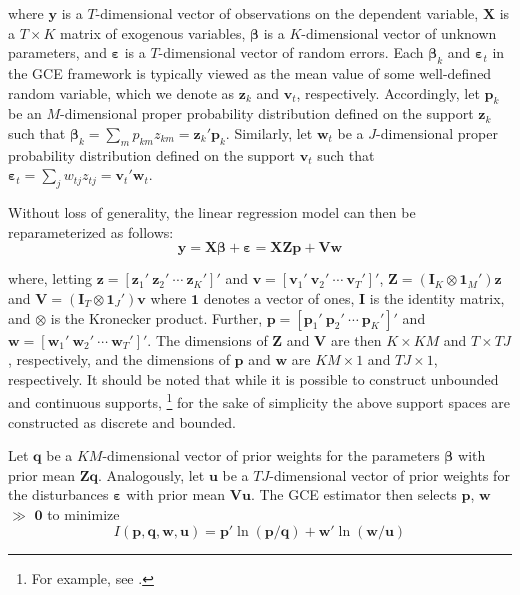 \documentclass[english]{article}
\begin{document}
\noindent
where $\mathbf{y}$ is a $T$-dimensional vector of observations on the 
dependent variable, $\mathbf{X}$ is a $T\times K$ matrix of exogenous
variables, $\mathbf{\beta}$ is a $K$-dimensional vector of unknown 
parameters, and $\mathbf{\varepsilon}$ is a $T$-dimensional vector of 
random errors.
Each $\mathbf{\beta}_k$ and $\mathbf{\varepsilon}_t$ in the GCE 
framework is typically viewed as the mean value of some well-defined 
random variable, which we denote as $\mathbf{z}_k$ and $\mathbf{v}_t$, 
respectively.
Accordingly, let $\mathbf{p}_k$ be an $M$-dimensional proper 
probability distribution defined on the support $\mathbf{z}_k$ such that 
$\mathbf{\beta}_k = \sum_m p_{km}z_{km} = \mathbf{z}_k' 
\mathbf{p}_k$.
Similarly, let $\mathbf{w}_t$ be a $J$-dimensional proper probability 
distribution defined on the support $\mathbf{v}_t$ such that  
$\mathbf{\varepsilon}_t = \sum_j w_{tj}z_{tj} = \mathbf{v}_t' 
\mathbf{w}_t$.

Without loss of generality, the linear regression model can then be 
reparameterized as follows:
\begin{equation}
\mathbf{y} = \mathbf{X\beta} + \mathbf{\varepsilon} = 
\mathbf{X Z p} + \mathbf{V w}
\label{eq: reparm}
\end{equation}

\noindent
where, letting $\mathbf{z}=[\mathbf{z}_1' ~ \mathbf{z}_2' ~ \cdots ~ 
\mathbf{z}_K' ]'$ and $\mathbf{v}=[\mathbf{v}_1' ~ \mathbf{v}_2' ~ 
\cdots ~ \mathbf{v}_T' ]'$, 
$\mathbf{Z}= (\mathbf{I}_K \otimes \mathbf{1}_M')\mathbf{z}$ and
$\mathbf{V}= (\mathbf{I}_T \otimes \mathbf{1}_J')\mathbf{v}$
where $\mathbf{1}$ denotes a vector of ones, $\mathbf{I}$ is the 
identity matrix, and $\otimes$ is the Kronecker product.
Further, $\mathbf{p} = [\mathbf{p}_1' ~ \mathbf{p}_2' ~ \cdots ~ 
\mathbf{p}_K' ]'$ and $\mathbf{w} = [\mathbf{w}_1' ~ \mathbf{w}_2' 
~ \cdots ~ \mathbf{w}_T' ]'$.
The dimensions of $\mathbf{Z}$ and $\mathbf{V}$ are then 
$K \times KM$ and $T \times TJ$, respectively, and the dimensions of 
$\mathbf{p}$ and $\mathbf{w}$ are $KM \times 1$ and $TJ \times 1$, 
respectively.
It should be noted that while it is possible to construct unbounded and 
continuous supports,%
\footnote{For example, see \citet{golan2002}.}
for the sake of simplicity the above support spaces are constructed as 
discrete and bounded. 

Let $\mathbf{q}$ be a $KM$-dimensional vector of prior weights for the 
parameters $\mathbf{\beta}$ with prior mean $\mathbf{Zq}$.
Analogously, let $\mathbf{u}$ be a $TJ$-dimensional vector of prior weights 
for the disturbances $\mathbf{\varepsilon}$ with prior mean $\mathbf{Vu}$.
The GCE estimator then selects $\mathbf{p}$, $\mathbf{w}$ $\gg$ 
$\mathbf{0}$ to minimize 
\begin{equation}
I({\mathbf{p}, \mathbf{q}, \mathbf{w}, \mathbf{u}}) = 
\mathbf{p}' \ln (\mathbf{p}/\mathbf{q}) + 
\mathbf{w}' \ln (\mathbf{w}/\mathbf{u})
\label{eq: ce}
\end{equation}
\end{document}
